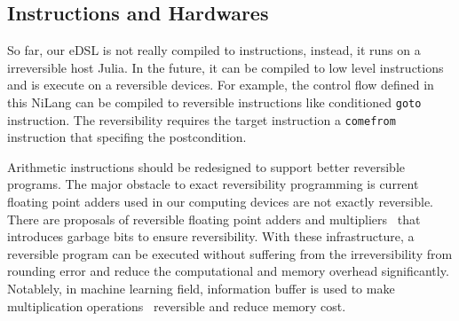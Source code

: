 \documentclass[aps,twocolumn,longbibliography,english,superscriptaddress]{revtex4-1}
\newcommand{\<}{\langle}
\renewcommand{\>}{\rangle}
\theoremstyle{definition}\newtheorem{definition}{\textit{Definition}}
\begin{document}

\subsection{Instructions and Hardwares}\label{sec:hardware}
So far, our eDSL is not really compiled to instructions, instead, it runs on a irreversible host Julia.
In the future, it can be compiled to low level instructions and is execute on a reversible devices.
For example, the control flow defined in this NiLang can be compiled to reversible instructions like conditioned \texttt{goto} instruction.
The reversibility requires the target instruction a \texttt{comefrom} instruction that specifing the postcondition. ~\cite{Vieri1999}

Arithmetic instructions should be redesigned to support better reversible programs.
The major obstacle to exact reversibility programming is current floating point adders used in our computing devices are not exactly reversible.
There are proposals of reversible floating point adders and multipliers~\cite{Nachtigal2010,Nachtigal2011,Nguyen2013,Hner2018} that introduces garbage bits to ensure reversibility.
With these infrastructure, a reversible program can be executed without suffering from the irreversibility from rounding error and reduce the computational and memory overhead significantly.
Notablely, in machine learning field, information buffer is used to make multiplication operations~\cite{Maclaurin2015} reversible and reduce memory cost.
\end{document}
